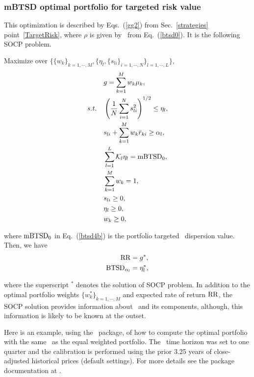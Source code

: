\BackToContents


\subsubsection{mBTSD optimal portfolio for targeted risk value}
This optimization is described by Eqs.~(\ref{gg2}) from Sec.~\ref{strategies} point~\ref{TargetRisk},
where $\rho$ is given by \mBTSD\ from Eq.\ (\ref{btsd0}).
It is the following SOCP problem.

\bigskip
\noindent Maximize over $\{\{w_k\}_{k=1,\cdots,M}, \{ \eta_l, \{ s_{li} \}_{i=1,\cdots,N} \}_{l=1,\cdots,L} \}$,
\begin{subequations}\label{btsd4}
\begin{align}
    &g = \sum_{k=1}^M w_k \mu_k, \label{btsd4a} \\
    \st & \left( \frac{1}{N}  \sum_{i=1}^N s_{li}^2 \right)^{1/2} \leq \eta_l, \label{btsd4c} \\
    & s_{li} + \sum_{k=1}^M w_k \br_{ki} \geq \alpha_l, \label{btsd4d} \\
    & \sum_{l=1}^L \cK_l \eta_l = \mBTSD_0, \label{btsd4b} \\
    & \sum_{k=1}^M w_k = 1, \label{btsd4e} \\
    & s_{li} \geq 0, \label{btsd4g} \\
    & \eta_l \geq 0, \label{btsd4h} \\
    & w_k \geq 0, \label{btsd4f}
\end{align}
\end{subequations}

\noindent where ${\rm mBTSD}_0$ in Eq.~(\ref{btsd4b}) is the portfolio targeted \mBTSD\ dispersion value.
Then, we have
\begin{subequations}\label{btsd5}
\begin{align}
    \RR &= g^*, \label{btsd5a} \\
    \BTSD_{\alpha_l} &= \eta_l^*, \label{btsd5b}
\end{align}
\end{subequations}

\noindent where the superscript $^*$ denotes the solution of SOCP problem.
In addition to the optimal portfolio weights $\{w_k^*\}_{k=1,\cdots,M}$ and expected rate of return ${\rm RR}$,
the SOCP solution provides information about \mBTSD\ and its components,
although, this information is likely to be known at the outset.

\bigskip
\noindent Here is an example, using the \azapy\ package, of how to compute the optimal portfolio
with the same \mBTSD\ as the equal weighted portfolio.
The \mBTSD\ time horizon was set to one quarter and the calibration is performed using the prior 3.25 years of
close-adjusted historical prices (default settings).
For more details see the package documentation at \azapydoc.


